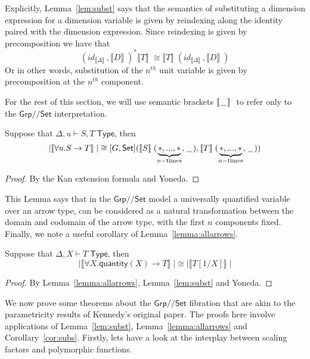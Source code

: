 \documentclass[a4paper,UKenglish]{lipics}
\newcommand{\msf}[1]{\mathsf{#1}} %
\newcommand{\Grp}{\msf{Grp}}
\newcommand{\Set}{\msf{Set}}
\newcommand{\blank}{\, \underline{\hspace{2mm}} \,}
\newcommand{\GroupSet}[1]{[#1,\Set]}
\newcommand{\Lslice}[1]{#1/\!/\Set}
\newcommand{\GrpSet}{\Lslice{\Grp}}
\newcommand{\GSet}{\GroupSet{G}}
\newcommand{\sem}[1]{\ensuremath{\llbracket #1 \rrbracket} \;}
\newcommand{\qnt}{\msf{quantity}}
\begin{document}
Explicitly, Lemma~\ref{lem:subst} says that the semantics of substituting a dimension expression for a dimension variable is given by reindexing along the identity paired with the dimension expression. Since reindexing is given by precomposition we have that
\[
 (id_{\sem{\Delta}} , \sem{D})^\ast \sem{T} \cong \sem{T}(id_{\sem{\Delta}}, \sem{D})
\]
Or in other words, substitution of the $n^{th}$ unit variable is given by precomposition at the $n^{th}$ component.

For the rest of this section, we will use semantic brackets $\sem{\, \underline{\hspace{2mm}}\, }$ to refer only to the $\GrpSet$ interpretation.

\begin{lemma}
\label{lemma:allarrows}
 Suppose that $\Delta, u \vdash S,T \; \msf{ Type}$, then
\[
|\sem{\forall u. S \rightarrow T}| \cong \GSet (\sem{S}(\underbrace{\ast,...,\ast}_{n-\text{times}}, \blank),\sem{T}(\underbrace{\ast,...,\ast}_{n-\text{times}}, \blank))
\]
\end{lemma}
\begin{proof}
By the Kan extension formula and Yoneda.
\end{proof}

This Lemma says that in the $\GrpSet$ model a universally quantified variable over an arrow type, can be considered as a natural transformation between the domain and codomain of the arrow type, with the first $n$ components fixed. Finally, we note a useful corollary of Lemma~\ref{lemma:allarrows}.
\begin{corollary}
\label{cor:subs}
Suppose that $\Delta, X \vdash T \; \msf{ Type}$, then
 \[
  |\sem{\forall X . \qnt(X) \rightarrow T}| \cong |\sem{T[1/X]}|
\]
\end{corollary}
\begin{proof}
 By Lemma~\ref{lemma:allarrows}, Lemma~\ref{lem:subst} and Yoneda.
\end{proof}



We now prove some theorems about the $\GrpSet$ fibration that are akin to the parametricity results of Kennedy's original paper. The proofs here involve applications of Lemma~\ref{lem:subst}, Lemma~\ref{lemma:allarrows} and Corollary~\ref{cor:subs}. Firstly, lets have a look at the interplay between scaling factors and polymorphic functions.
\end{document}
